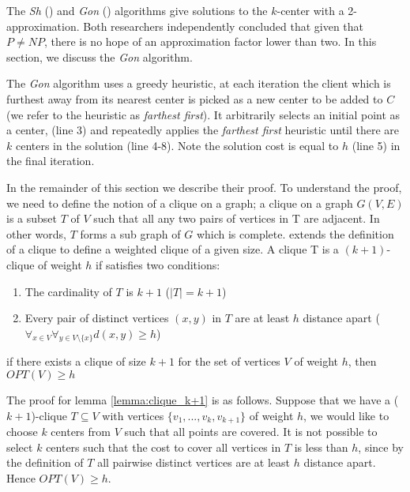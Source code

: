 The \emph{Sh} (\cite{hochbaum_best_1985}) and \emph{Gon} (\cite{gonzalez_clustering_1985}) algorithms give solutions to the $k$-center with a 2-approximation. Both researchers independently concluded that given that $P\neq NP$, there is no hope of an approximation factor lower than two. In this section, we discuss the \emph{Gon} algorithm.

The \emph{Gon} algorithm uses a greedy heuristic, at each iteration the client which is furthest away from its nearest center is picked as a new center to be added to $C$ (we refer to the heuristic as \emph{farthest first}). It arbitrarily selects an initial point as a center, (line 3) and repeatedly applies the \emph{farthest first} heuristic until there are $k$ centers in the solution (line 4-8). Note the solution cost is equal to $h$ (line 5) in the final iteration.



In the remainder of this section we describe their proof. To understand the proof, we need to define the notion of a clique on a graph; a clique on a graph $G(V, E)$ is a subset $T$ of $V$ such that all any two pairs of vertices in T are adjacent. In other words, $T$ forms a sub graph of $G$ which is complete. \textcite{gonzalez_clustering_1985} extends the definition of a clique to define a weighted clique of a given size. A clique T is a $(k+1)$-clique of weight $h$ if satisfies two conditions:
\begin{enumerate}
    \item The cardinality of $T$ is $k+1$ ($|T|=k+1$)
    \item Every pair of distinct vertices $(x,y)$ in $T$ are at least $h$ distance apart ($\forall _{x\in V}\forall _{y\in V\setminus \{x\}}d(x,y)\geq h$)
\end{enumerate}

\begin{lemma}\label{lemma:clique_k+1}
if there exists a clique of size $k+1$ for the set of vertices $V$ of weight $h$, then $OPT(V)\geq h$
\end{lemma} 

The proof for lemma \ref{lemma:clique_k+1} is as follows. Suppose that we have a ($k+1$)-clique $T\subseteq V$ with vertices $\{v_1, ...,v_k,v_{k+1}\}$ of weight $h$, we would like to choose $k$ centers from $V$ such that all points are covered. It is not possible to select $k$ centers such that the cost to cover all vertices in $T$ is less than $h$, since by the definition of $T$ all pairwise distinct vertices are at least $h$ distance apart. Hence $OPT(V)\geq h$.

